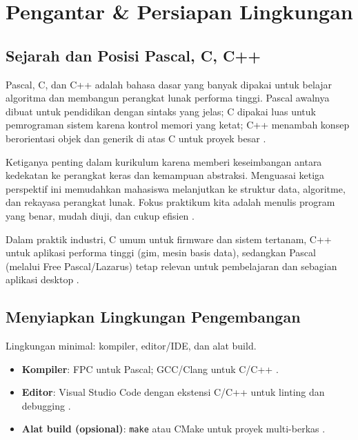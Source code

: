 \documentclass[../main.tex]{subfiles}
\begin{document}
\chapter{Pengantar \& Persiapan Lingkungan}
\section{Sejarah dan Posisi Pascal, C, C++}
Pascal, C, dan C++ adalah bahasa dasar yang banyak dipakai untuk belajar algoritma dan membangun perangkat lunak performa tinggi. Pascal awalnya dibuat untuk pendidikan dengan sintaks yang jelas; C dipakai luas untuk pemrograman sistem karena kontrol memori yang ketat; C++ menambah konsep berorientasi objek dan generik di atas C untuk proyek besar \parencite{pascal-tutorial-wikibooks,gnu-c-manual,cpp-reference}.

Ketiganya penting dalam kurikulum karena memberi keseimbangan antara kedekatan ke perangkat keras dan kemampuan abstraksi. Menguasai ketiga perspektif ini memudahkan mahasiswa melanjutkan ke struktur data, algoritme, dan rekayasa perangkat lunak. Fokus praktikum kita adalah menulis program yang benar, mudah diuji, dan cukup efisien \parencite{free-pascal-docs,gnu-c-manual,cpp-reference}.

Dalam praktik industri, C umum untuk firmware dan sistem tertanam, C++ untuk aplikasi performa tinggi (gim, mesin basis data), sedangkan Pascal (melalui Free Pascal/Lazarus) tetap relevan untuk pembelajaran dan sebagian aplikasi desktop \parencite{free-pascal-docs}.

\section{Menyiapkan Lingkungan Pengembangan}
Lingkungan minimal: kompiler, editor/IDE, dan alat build.
\begin{itemize}
  \item \textbf{Kompiler}: FPC untuk Pascal; GCC/Clang untuk C/C++ \parencite{free-pascal-docs,gcc-docs,clang-docs}.
  \item \textbf{Editor}: Visual Studio Code dengan ekstensi C/C++ untuk linting dan debugging \parencite{vscode-cpp}.
  \item \textbf{Alat build (opsional)}: \texttt{make} atau CMake untuk proyek multi-berkas \parencite{gnu-make,cmake-docs}.
\end{itemize}
\end{document}
